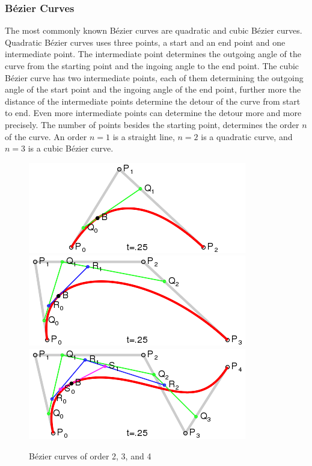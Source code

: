 \subsubsection{Bézier Curves}
\label{sec:bezier-curves}

The most commonly known Bézier curves are quadratic and cubic Bézier curves. Quadratic Bézier curves uses three points, a start
and an end point and one intermediate point. The intermediate point determines the outgoing angle of the curve from the starting
point and the ingoing angle to the end point. The cubic Bézier curve has two intermediate points, each of them determining the 
outgoing angle of the start point and the ingoing angle of the end point, further more the distance of the intermediate points
determine the detour of the curve from start to end. Even more intermediate points can determine the detour more and more precisely.
The number of points besides the starting point, determines the order $n$ of the curve. An order $n = 1$ is a straight line,
$n = 2$ is a quadratic curve, and $n = 3$ is a cubic Bézier curve.

\begin{figure}[htp]
\begin{center}
	  \includegraphics[scale=0.4]{image/wiki_bezier_2.png}
	  \includegraphics[scale=0.4]{image/wiki_bezier_3.png}
	  \includegraphics[scale=0.4]{image/wiki_bezier_4.png}
	  \caption{Bézier curves of order 2, 3, and 4}
	  \label{fig:wiki_bezier}
\end{center}
\end{figure}

